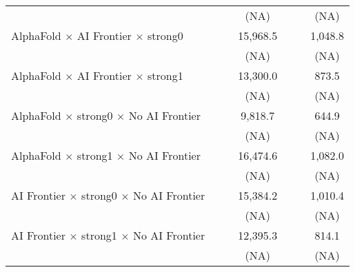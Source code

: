 \begin{tabular}{lcccccc}
                                                                              &                        &         & (NA)     &                        &       & (NA)\\   
   AlphaFold $\times$ AI Frontier $\times$ strong0                            &                        &         & 15,968.5 &                        &       & 1,048.8\\   
                                                                              &                        &         & (NA)     &                        &       & (NA)\\   
   AlphaFold $\times$ AI Frontier $\times$ strong1                            &                        &         & 13,300.0 &                        &       & 873.5\\   
                                                                              &                        &         & (NA)     &                        &       & (NA)\\   
   AlphaFold $\times$ strong0 $\times$ No AI Frontier                         &                        &         & 9,818.7  &                        &       & 644.9\\   
                                                                              &                        &         & (NA)     &                        &       & (NA)\\   
   AlphaFold $\times$ strong1 $\times$ No AI Frontier                         &                        &         & 16,474.6 &                        &       & 1,082.0\\   
                                                                              &                        &         & (NA)     &                        &       & (NA)\\   
   AI Frontier $\times$ strong0 $\times$ No AI Frontier                       &                        &         & 15,384.2 &                        &       & 1,010.4\\   
                                                                              &                        &         & (NA)     &                        &       & (NA)\\   
   AI Frontier $\times$ strong1 $\times$ No AI Frontier                       &                        &         & 12,395.3 &                        &       & 814.1\\   
                                                                              &                        &         & (NA)     &                        &       & (NA)\\   

\end{tabular}
